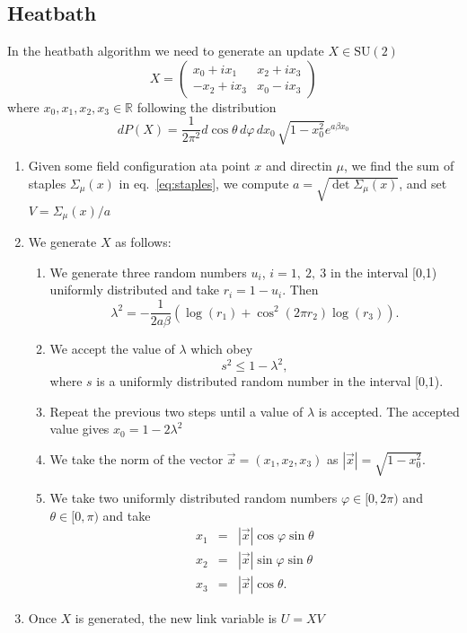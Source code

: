 \documentclass[12pt,a4paper]{article}
\begin{document}
\subsection{Heatbath}\label{sec:heatbath}
In the heatbath algorithm we need to generate an update $X\in\text{SU}(2)$
	 \begin{equation}
	 	X = \begin{pmatrix}
	 		 x_0 + ix_1 & x_2 + ix_3 \\
	 		-x_2 + ix_3 & x_0 - ix_3
	 	\end{pmatrix}
	 \end{equation}
	 where $x_0, x_1, x_2,x_3 \in \mathbb{R}$
 following the distribution
\begin{equation}
	dP(X) = \frac{1}{2\pi^2} d\cos\theta\, d\varphi\, dx_0\, \sqrt{1-x_0^2}e^{a\beta x_0}
\end{equation}
\begin{enumerate}
\item Given some field configuration ata point $x$ and directin $\mu$, we find the sum of staples $\Sigma_{\mu}(x)$ in eq.\ \eqref{eq:staples}, we compute $a = \sqrt{\det \Sigma_{\mu}(x)}$, and set $V = \Sigma_{\mu}(x)/a$
	\item We generate $X$ as follows:
	\begin{enumerate}
	\item	We generate three random numbers $u_i$, $i = 1,\ 2,\ 3$ in the interval [0,1) uniformly distributed and take $r_i = 1 - u_i$. Then
		 \begin{equation}
		 	\lambda^2 = -\frac{1}{2a\beta}\left(\log(r_1) + \cos^2(2\pi r_2)\log(r_3)\right).
		 \end{equation}
	\item We accept the value of $\lambda$ which obey
		\begin{equation}
			s^2 \leq 1- \lambda^2,
		\end{equation}
		where $s$ is a uniformly distributed random number in the interval [0,1).
	\item Repeat the previous two steps until a value of $\lambda$ is accepted. The accepted value gives $x_0 = 1 - 2\lambda^2$
	\item We take the norm of the vector $\vec{x} = (x_1,x_2,x_3)$ as $|\vec{x}| = \sqrt{1 - x_0^2}$.
	\item We take two uniformly distributed random numbers $\varphi\in [0,2\pi)$ and $\theta \in [0,\pi)$ and take
	\begin{eqnarray}
		x_1 & = & |\vec{x}| \cos\varphi \sin\theta \\
		x_2 & = & |\vec{x}| \sin\varphi \sin\theta \\
		x_3 & = & |\vec{x}| \cos\theta	.
	\end{eqnarray}		
	  
	\end{enumerate}
	\item Once $X$ is generated, the new link variable is $U = X V$
\end{enumerate}
\end{document}
